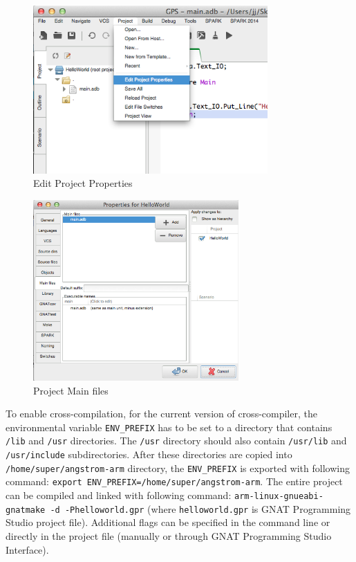 \begin{figure}[ht]%
    \begin{center}
    	\includegraphics[width=0.8\textwidth]{figures/EditProjectProperties.png}    	
    \end{center}
    \caption{Edit Project Properties}
    \label{figure:editprojectproperties}
\end{figure}

\begin{figure}[ht]%
    \begin{center}
    	\includegraphics[width=0.7\textwidth]{figures/Properties-MainFiles.png}    	
    \end{center}
    \caption{Project Main files}
    \label{figure:mainfiles}
\end{figure}

To enable cross-compilation, for the current version of cross-compiler, the environmental variable \lstinline{ENV_PREFIX} has to be set to a directory that contains \lstinline{/lib} and \lstinline{/usr} directories. The \lstinline{/usr} directory should also contain \lstinline{/usr/lib} and \lstinline{/usr/include} subdirectories. After these directories are copied into \lstinline{/home/super/angstrom-arm} directory, the \lstinline{ENV_PREFIX} is exported with following command: \lstinline{export ENV_PREFIX=/home/super/angstrom-arm}. The entire project can be compiled and linked with following command: \lstinline{arm-linux-gnueabi-gnatmake -d -Phelloworld.gpr} (where \lstinline{helloworld.gpr} is GNAT Programming Studio project file). Additional flags can be specified in the command line or directly in the project file (manually or through GNAT Programming Studio Interface).

